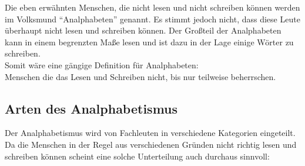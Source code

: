 Die eben erwähnten Menschen, die nicht lesen und nicht schreiben können werden im Volksmund "`Analphabeten"' genannt. Es stimmt jedoch nicht, dass diese Leute überhaupt nicht lesen und schreiben können. Der Großteil der Analphabeten kann in einem begrenzten Maße lesen und ist dazu in der Lage einige Wörter zu schreiben.\\


Somit wäre eine gängige Definition für Analphabeten:\\


Menschen die das Lesen und Schreiben nicht, bis nur teilweise beherrschen.


\subsection{Arten des Analphabetismus}

Der Analphabetismus wird von Fachleuten in verschiedene Kategorien eingeteilt. Da die Menschen in der Regel aus verschiedenen Gründen nicht richtig lesen und schreiben können scheint eine solche Unterteilung auch durchaus sinnvoll:

